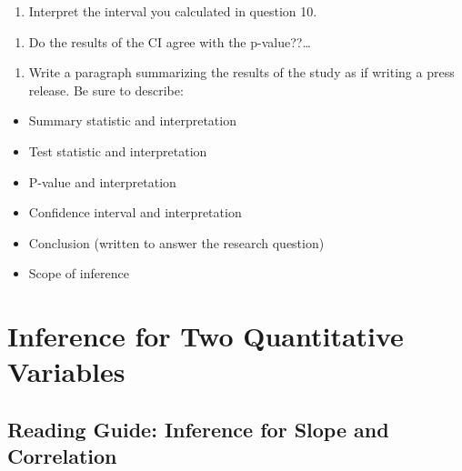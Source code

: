 \documentclass[
]{report}
\providecommand{\tightlist}{%
  \setlength{\itemsep}{0pt}\setlength{\parskip}{0pt}}
\begin{document}
\vspace{0.3in}

\begin{enumerate}
\def\labelenumi{\arabic{enumi}.}
\setcounter{enumi}{10}
\tightlist
\item
  Interpret the interval you calculated in question 10.
\end{enumerate}

\vspace{1in}

\begin{enumerate}
\def\labelenumi{\arabic{enumi}.}
\setcounter{enumi}{12}
\tightlist
\item
  Do the results of the CI agree with the p-value??\ldots{}
\end{enumerate}

\vspace{0.5in}

\begin{enumerate}
\def\labelenumi{\arabic{enumi}.}
\setcounter{enumi}{13}
\tightlist
\item
  Write a paragraph summarizing the results of the study as if writing a press release. Be sure to describe:
\end{enumerate}

\begin{itemize}
\item
  Summary statistic and interpretation
\item
  Test statistic and interpretation
\item
  P-value and interpretation
\item
  Confidence interval and interpretation
\item
  Conclusion (written to answer the research question)
\item
  Scope of inference
\end{itemize}

\vspace{2in}

\hypertarget{inference-for-two-quantitative-variables}{%
\chapter{Inference for Two Quantitative Variables}\label{inference-for-two-quantitative-variables}}

\hypertarget{reading-guide-inference-for-slope-and-correlation}{%
\section{Reading Guide: Inference for Slope and Correlation}\label{reading-guide-inference-for-slope-and-correlation}}
\end{document}
